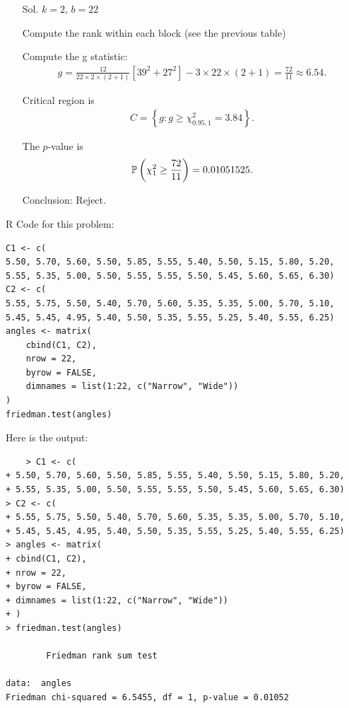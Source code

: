 \begin{frame}[fragile]
\begin{itemize}
	\item[Sol.] $k=2$,  $b=22$
	\bigskip
	\item[] Compute the rank within each block (see the previous table)
	\bigskip
	\item[] Compute the g statistic:
	\begin{align*}
		g=\frac{12}{22\times 2 \times (2+1)} \left[39^2+27^2\right] - 3 \times 22 \times (2+1) = \frac{72}{11}\approx 6.54.
	\end{align*}
	\bigskip
	\item[] Critical region is
	\begin{align*}
		C = \left\{ g: g\ge \chi_{0.95,1}^2 = 3.84\right\}.
	\end{align*}
	\item[] The $p$-value is
		 \begin{align*}
			 \mathbb{P}\left(\chi_1^2 \ge \frac{72}{11}\right) = 0.01051525.
		\end{align*}
	\item[] Conclusion: Reject. \myQED
\end{itemize}
\end{frame}
\begin{frame}[fragile]
	R Code for this problem:
\bigskip
\begin{lstlisting}
C1 <- c(
5.50, 5.70, 5.60, 5.50, 5.85, 5.55, 5.40, 5.50, 5.15, 5.80, 5.20,
5.55, 5.35, 5.00, 5.50, 5.55, 5.55, 5.50, 5.45, 5.60, 5.65, 6.30)
C2 <- c(
5.55, 5.75, 5.50, 5.40, 5.70, 5.60, 5.35, 5.35, 5.00, 5.70, 5.10,
5.45, 5.45, 4.95, 5.40, 5.50, 5.35, 5.55, 5.25, 5.40, 5.55, 6.25)
angles <- matrix(
	cbind(C1, C2),
	nrow = 22,
	byrow = FALSE,
	dimnames = list(1:22, c("Narrow", "Wide"))
)
friedman.test(angles)
\end{lstlisting}
\end{frame}
\begin{frame}[fragile]

Here is the output:
\bigskip
\begin{lstlisting}
	> C1 <- c(
+ 5.50, 5.70, 5.60, 5.50, 5.85, 5.55, 5.40, 5.50, 5.15, 5.80, 5.20,
+ 5.55, 5.35, 5.00, 5.50, 5.55, 5.55, 5.50, 5.45, 5.60, 5.65, 6.30)
> C2 <- c(
+ 5.55, 5.75, 5.50, 5.40, 5.70, 5.60, 5.35, 5.35, 5.00, 5.70, 5.10,
+ 5.45, 5.45, 4.95, 5.40, 5.50, 5.35, 5.55, 5.25, 5.40, 5.55, 6.25)
> angles <- matrix(
+ cbind(C1, C2),
+ nrow = 22,
+ byrow = FALSE,
+ dimnames = list(1:22, c("Narrow", "Wide"))
+ )
> friedman.test(angles)

        Friedman rank sum test

data:  angles
Friedman chi-squared = 6.5455, df = 1, p-value = 0.01052
\end{lstlisting}
\end{frame}
